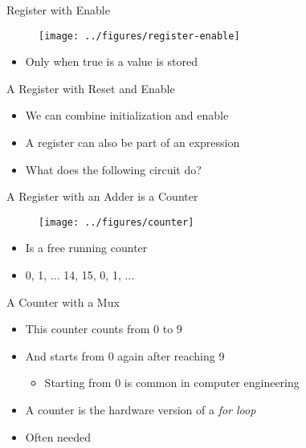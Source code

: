 \begin{frame}[fragile]{Register with Enable}
\begin{figure}
  \texttt{[image: ../figures/register-enable]}
\end{figure}
\begin{itemize}
\item Only when  true is a value is stored
\end{itemize}

\end{frame}

\begin{frame}[fragile]{A Register with Reset and Enable}
\begin{itemize}
\item We can combine initialization and enable
\end{itemize}
\begin{itemize}
\item A register can also be part of an expression
\item What does the following circuit do?
\end{itemize}
\end{frame}


\begin{frame}[fragile]{A Register with an Adder is a Counter}
\begin{figure}
  \texttt{[image: ../figures/counter]}
\end{figure}
\begin{itemize}
\item Is a free running counter
\item 0, 1, ... 14, 15, 0, 1, ...
\end{itemize}
\end{frame}


\begin{frame}[fragile]{A Counter with a Mux}
\begin{itemize}
\item This counter counts from 0 to 9
\item And starts from 0 again after reaching 9
\begin{itemize}
\item Starting from 0 is common in computer engineering
\end{itemize}
\item A counter is the hardware version of a \emph{for loop}
\item Often needed
\end{itemize}
\end{frame}

